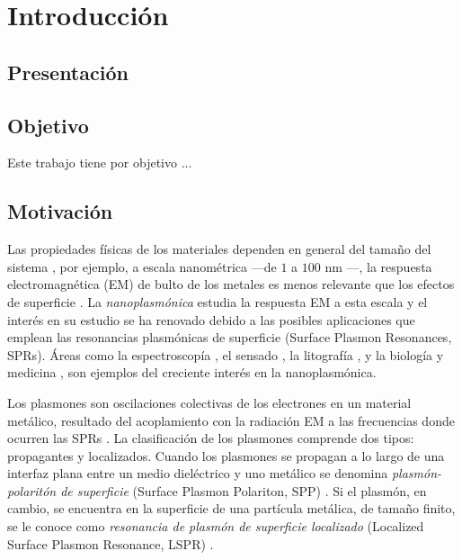 \chapter*{Introducción}

%

\section*{Presentación} %
\blindtext



\section*{Objetivo}

Este trabajo tiene por objetivo ...
\blindtext


\section*{Motivación}

Las propiedades f\'isicas de los materiales dependen en general del tamaño del sistema \cite{boverhof2015comparative}, por ejemplo, a escala nanom\'etrica ---de $1$ a $100$ nm \cite{boverhof2015comparative}---, la respuesta electromagn\'etica (EM) de bulto de los metales es menos relevante que los efectos de superficie \cite{zhao2008methods}.  La \emph{nanoplasm\'onica} estudia la respuesta EM a esta escala y el inter\'es en su estudio se ha renovado debido a las posibles aplicaciones que emplean las resonancias plasm\'onicas de superficie (Surface Plasmon Resonances, SPRs).  Áreas como la espectroscop\'ia \cite{novotny2006principles}, el sensado \cite{jain2008noble}, la litograf\'ia \cite{stockman2011nanoplasmonics}, y la biolog\'ia y  medicina \cite{jain2008noble}, son ejemplos del creciente interés en la nanoplasmónica. 

Los plasmones son oscilaciones colectivas de los electrones en un material metálico,  resultado del  acoplamiento con la radiaci\'on EM a las frecuencias donde ocurren las SPRs \cite{stockman2011nanoplasmonics}.  La clasificación de los plasmones comprende  dos tipos: propagantes y localizados.  Cuando los plasmones se propagan a lo largo de una interfaz plana entre un medio diel\'ectrico y uno met\'alico se denomina  \emph{plasm\'on-polarit\'on de superficie} (Surface Plasmon Polariton, SPP) \cite{maier2007plasmonics}.  Si el plasmón, en cambio, se encuentra en la superficie de una partícula  met\'alica, de tamaño finito, se le conoce como \emph{resonancia de plasm\'on de superficie localizado} (Localized Surface Plasmon Resonance, LSPR) \cite{maier2007plasmonics}. 

